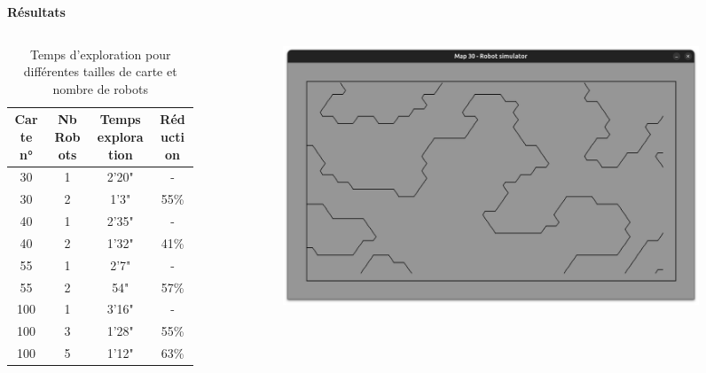 \documentclass[aspectratio=169,10pt]{beamer}
\begin{document}
\begin{frame}{\textbf{Résultats}}
	\begin{columns}
		\begin{column}{0.8\textwidth}
			\begin{table}[H]
				\centering
				\begin{tabular}{c c c c}
					\hline
					\textbf{Carte n°} & \textbf{Nb Robots} & \textbf{Temps exploration} & \textbf{Réduction} \\ 
					\hline
					30 & 1 & 2'20" & - \\
					30 & 2 & 1'3" & 55\% \\
					40 & 1 & 2'35" & - \\
					40 & 2 & 1'32" & 41\% \\
					55 & 1 & 2'7" & - \\
					55 & 2 & 54" & 57\% \\
					100 & 1 & 3'16" & - \\
					100 & 3 & 1'28" & 55\% \\
					100 & 5 & 1'12" & 63\% \\
				\end{tabular}
				\caption{Temps d'exploration pour différentes tailles de carte et nombre de robots}
				\label{tab:exploration_times_1}
			\end{table}
		\end{column}
		\begin{column}{0.2\textwidth}
			\begin{figure}[H]
				\centering
				\begin{subfigure}[b]{0.8\textwidth}
					\centering
					\includegraphics[width=\textwidth]{IMAGES/map30.png}
				\end{subfigure}
				\vfill
				\begin{subfigure}[b]{0.8\textwidth}

\end{subfigure}
\end{figure}
\end{column}
\end{columns}
\end{frame}
\end{document}
